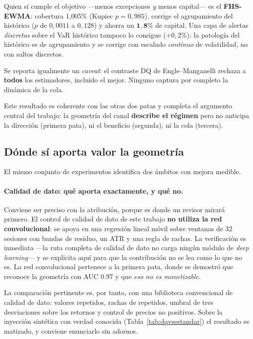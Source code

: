 \documentclass[11pt,a4paper]{article}
\begin{document}
Quien sí cumple el objetivo —menos excepciones \emph{y} menos capital— es el
\textbf{FHS-EWMA}: cobertura 1{,}005\% (Kupiec $p=0{,}985$), corrige el
agrupamiento del histórico ($p$ de $0{,}0011$ a $0{,}128$) y ahorra un
$\mathbf{1{,}8\%}$ de capital. Una capa de alertas \emph{discretas} sobre el VaR
histórico tampoco lo consigue ($+0{,}2\%$): la patología del histórico es de
agrupamiento y se corrige con escalado \emph{continuo} de volatilidad, no con
saltos discretos.

Se reporta igualmente un \emph{caveat}: el contraste DQ de Engle--Manganelli
rechaza a \textbf{todos} los estimadores, incluido el mejor. Ninguno captura por
completo la dinámica de la cola.

Este resultado es coherente con las otras dos patas y completa el argumento
central del trabajo: la geometría del canal \textbf{describe el régimen} pero no
anticipa la dirección (primera pata), ni el beneficio (segunda), ni la cola
(tercera).

\subsection{Dónde sí aporta valor la geometría}
El mismo conjunto de experimentos identifica dos ámbitos con mejora medible.

\paragraph{Calidad de dato: qué aporta exactamente, y qué no.}
\label{par:dq}
Conviene ser preciso con la atribución, porque es donde un revisor mirará
primero. El control de calidad de dato de este trabajo \textbf{no utiliza la red
convolucional}: se apoya en una regresión lineal móvil sobre ventanas de 32
sesiones con bandas de residuo, un ATR y una regla de rachas. La verificación es
inmediata —la ruta completa de calidad de dato no carga ningún módulo de
\emph{deep learning}— y se explicita aquí para que la contribución no se lea como
lo que no es. La red convolucional pertenece a la primera pata, donde se demostró
que reconoce la geometría con AUC 0.97 y que \emph{eso no es monetizable}.

La comparación pertinente es, por tanto, con una biblioteca convencional de
calidad de dato: valores repetidos, rachas de repetidos, umbral de tres
desviaciones sobre los retornos y control de precios no positivos. Sobre la
inyección sintética con verdad conocida (Tabla~\ref{tab:dqvsestandar}) el
resultado es matizado, y conviene enunciarlo sin adornos.
\end{document}
